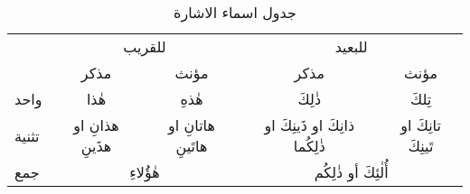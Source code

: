 \documentclass[../main.tex]{subfiles}
\begin{document}
\begin{table}[H]
\centering
\begin{tabular}{lcccc}
                           & \multicolumn{2}{c}{للقريب}                                                    & \multicolumn{2}{c}{للبعيد}                                                                  \\
                           & مذكر                                 & مؤنث                                   & مذكر                                               & مؤنث                                   \\ \cline{2-5} 
\multicolumn{1}{l|}{واحد}  & \multicolumn{1}{c|}{هٰذا}            & \multicolumn{1}{c|}{هٰذهِ}             & \multicolumn{1}{c|}{ذٰلِكَ}                        & \multicolumn{1}{c|}{تِلكَ}             \\ \cline{2-5} 
\multicolumn{1}{l|}{تثنية} & \multicolumn{1}{c|}{هذانِ او هذَينِ} & \multicolumn{1}{c|}{هاتانِ او هاتَينِ} & \multicolumn{1}{c|}{ذانِكَ او ذَينِكَ او ذٰلِكُما} & \multicolumn{1}{c|}{تانِكَ او تَينِكَ} \\ \cline{2-5} 
\multicolumn{1}{l|}{جمع}   & \multicolumn{2}{c|}{هٰؤُلاءِ}                                                 & \multicolumn{2}{c|}{أُلٰئِكَ أو ذٰلِكُم}                                                    \\ \cline{2-5} 
\end{tabular}
\caption{جدول اسماء الاشارة}
\label{table:ishara}
\end{table}
\end{document}
